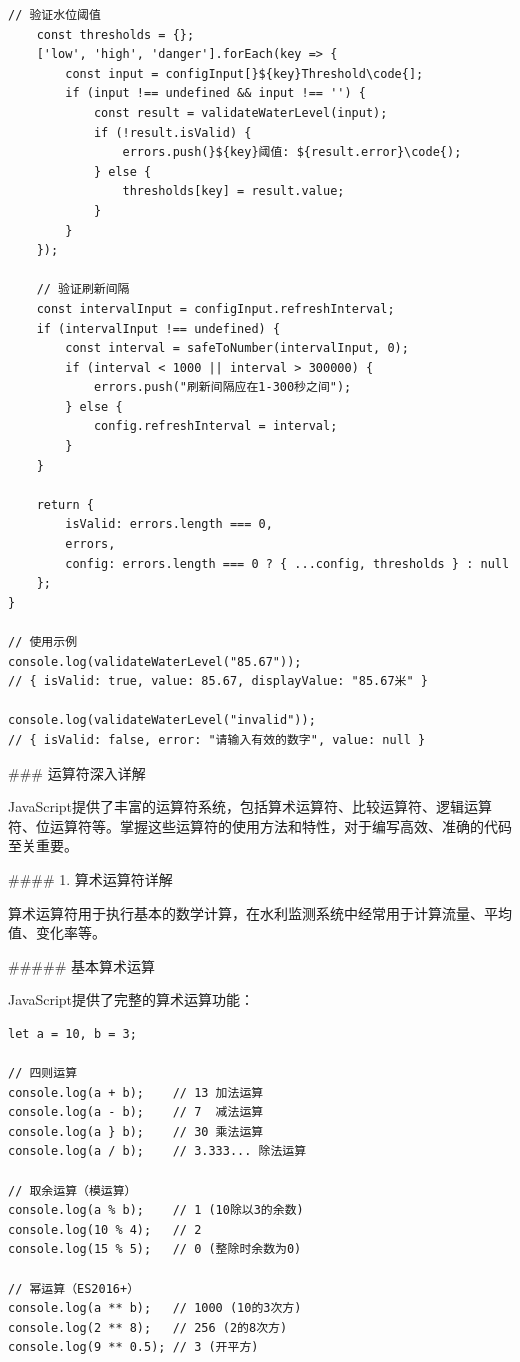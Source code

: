 {\begin{lstlisting}[style=javascript]
    // 验证水位阈值
    const thresholds = {};
    ['low', 'high', 'danger'].forEach(key => {
        const input = configInput[}${key}Threshold\code{];
        if (input !== undefined && input !== '') {
            const result = validateWaterLevel(input);
            if (!result.isValid) {
                errors.push(}${key}阈值: ${result.error}\code{);
            } else {
                thresholds[key] = result.value;
            }
        }
    });
    
    // 验证刷新间隔
    const intervalInput = configInput.refreshInterval;
    if (intervalInput !== undefined) {
        const interval = safeToNumber(intervalInput, 0);
        if (interval < 1000 || interval > 300000) {
            errors.push("刷新间隔应在1-300秒之间");
        } else {
            config.refreshInterval = interval;
        }
    }
    
    return {
        isValid: errors.length === 0,
        errors,
        config: errors.length === 0 ? { ...config, thresholds } : null
    };
}

// 使用示例
console.log(validateWaterLevel("85.67"));  
// { isValid: true, value: 85.67, displayValue: "85.67米" }

console.log(validateWaterLevel("invalid")); 
// { isValid: false, error: "请输入有效的数字", value: null }
\end{lstlisting}

### 运算符深入详解

JavaScript提供了丰富的运算符系统，包括算术运算符、比较运算符、逻辑运算符、位运算符等。掌握这些运算符的使用方法和特性，对于编写高效、准确的代码至关重要。

#### 1. 算术运算符详解

算术运算符用于执行基本的数学计算，在水利监测系统中经常用于计算流量、平均值、变化率等。

##### 基本算术运算

JavaScript提供了完整的算术运算功能：

\begin{lstlisting}[style=javascript]
let a = 10, b = 3;

// 四则运算
console.log(a + b);    // 13 加法运算
console.log(a - b);    // 7  减法运算
console.log(a } b);    // 30 乘法运算
console.log(a / b);    // 3.333... 除法运算

// 取余运算（模运算）
console.log(a % b);    // 1 (10除以3的余数)
console.log(10 % 4);   // 2
console.log(15 % 5);   // 0 (整除时余数为0)

// 幂运算（ES2016+）
console.log(a ** b);   // 1000 (10的3次方)
console.log(2 ** 8);   // 256 (2的8次方)
console.log(9 ** 0.5); // 3 (开平方)
\end{lstlisting}

}
